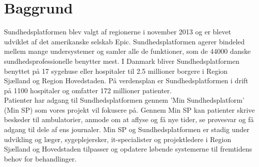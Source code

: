 \section{Baggrund}
Sundhedsplatformen blev valgt af regionerne i november 2013 og er blevet udviklet af det amerikanske selskab Epic. Sundhedsplatformen agerer bindeled mellem mange undersystemer og samler alle de funktioner, som de 44000 danske sundhedsprofessionelle benytter mest. I Danmark bliver Sundhedsplatformen benyttet på 17 sygehuse eller hospitaler til 2.5 millioner borgere i Region Sjælland og Region Hovedstaden. På verdensplan er Sundhedsplatformen i drift på 1100 hospitaler og omfatter 172 millioner patienter.\\
Patienter har adgang til Sundhedsplatformen gennem 'Min Sundhedsplatform' (Min SP) som vores projekt vil fokusere på. Gennem Min SP kan patienter skrive beskeder til ambulatorier, anmode om at aflyse og få nye tider, se prøvesvar og få adgang til dele af ens journaler. Min SP og Sundhedsplatformen er stadig under udvikling og læger, sygeplejersker, it-specialister og projektledere i Region Sjælland og Hovedstaden tilpasser og opdatere løbende systemerne til fremtidens behov for behandlinger.

